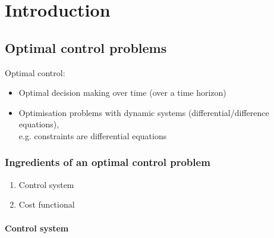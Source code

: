 \section{Introduction}
\subsection{Optimal control problems}

Optimal control:
\begin{itemize}
\item Optimal decision making over time
        (over a time horizon)
\item Optimisation problems with dynamic systems
        (differential/difference equations),\\
        e.g. constraints are differential equations
\end{itemize}

\subsubsection{Ingredients of an optimal control problem}
\begin{enumerate}
\item Control system
\item Cost functional
\end{enumerate}

\paragraph{Control system}~\\
\begin{figure}[H]
    \centering
    \label{fig:control-system}
\end{figure}

